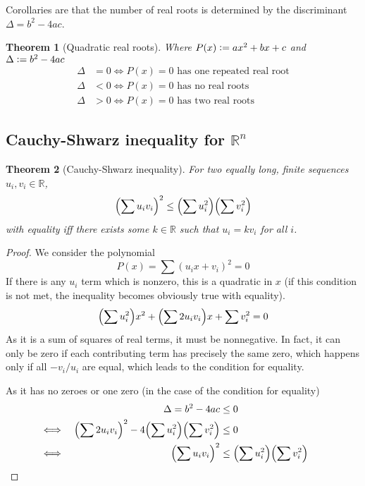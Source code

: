 \documentclass[fleqn,a4paper,11pt]{article}
\newcommand{\defeq}{\vcentcolon=}
\newcommand{\setstyle}{\mathbb}
\newcommand{\Reals}{\setstyle R}
\newtheorem{theorem}{Theorem}[section]
\begin{document}
    Corollaries are that the number of real roots is determined by the
    discriminant \({\Delta = b^2 - 4ac}\).
    \begin{theorem}[Quadratic real roots]
    Where \(P(x) \defeq ax^2 + bx + c\) and \(\Delta \defeq b^2 - 4ac\)
    \begin{align*}
    \Delta &= 0 \iff \text{\(P(x) = 0\) has one repeated real root} \\
    \Delta &< 0 \iff \text{\(P(x) = 0\) has no real roots} \\
    \Delta &> 0 \iff \text{\(P(x) = 0\) has two real roots}
    \end{align*}
    \end{theorem}

    \subsection[Cauchy-Shwarz inequality for \(\Reals^n\)]
               {Cauchy-Shwarz inequality for \boldmath\(\Reals^n\)}

    \begin{theorem}[Cauchy-Shwarz inequality]
    For two equally long, finite sequences \(u_i, v_i \in \Reals\),
    \begin{equation*}
    \pqty{\sum u_i v_i}^2 \le \pqty{\sum u_i^2} \pqty{\sum v_i^2}
    \end{equation*}
    with equality iff there exists some \(k \in \Reals\) such that
    \(u_i = k v_i\) for all \(i\).
    \end{theorem}
    \begin{proof}
    We consider the polynomial
    \begin{equation*}
    P(x) = \sum (u_i x + v_i)^2 = 0
    \end{equation*}
    If there is any \(u_i\) term which is nonzero, this is a quadratic in \(x\)
    (if this condition is not met, the inequality becomes obviously true with
    equality).
    \begin{equation*}
    \pqty{\sum u_i^2} x^2 + \pqty{\sum 2 u_i v_i} x + \sum v_i^2 = 0
    \end{equation*}
    As it is a sum of squares of real terms, it must be nonnegative. In fact, it
    can only be zero if each contributing term has precisely the same zero,
    which happens only if all \(-v_i/u_i\) are equal, which leads to the
    condition for equality.

    As it has no zeroes or one zero (in the case of the condition for equality)
    \begin{alignat*}{2}
    &&\Delta = b^2 - 4ac &\le 0 \\
    &\iff&
    \pqty{\sum 2 u_i v_i}^2 - 4\pqty{\sum u_i^2}\pqty{\sum v_i^2} &\le 0 \\
    &\iff& \pqty{\sum u_i v_i}^2 &\le \pqty{\sum u_i^2} \pqty{\sum v_i^2}
        \tag*{\qedhere}
    \end{alignat*}
    \end{proof}
\end{document}
